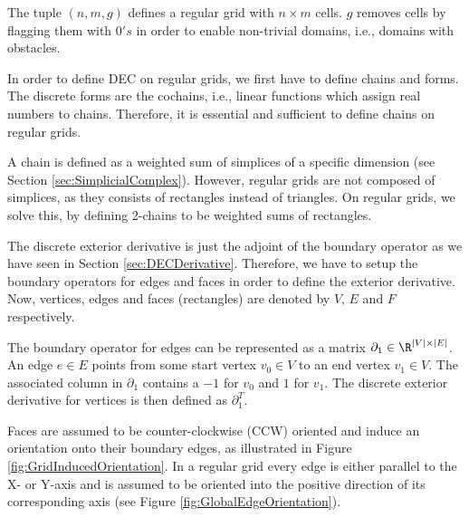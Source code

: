 The tuple $(n,m,g)$ defines a regular grid with $n \times m$ cells.
$g$ removes cells by flagging them with $0's$ in order to enable non-trivial domains, i.e., domains with obstacles.


In order to define DEC on regular grids, we first have to define chains and forms.
The discrete forms are the cochains, i.e., linear functions which assign real numbers to chains.
Therefore, it is essential and sufficient to define chains on regular grids.

A chain is defined as a weighted sum of simplices of a specific dimension (see Section \ref{sec:SimplicialComplex}).
However, regular grids are not composed of simplices, as they consists of rectangles instead of triangles.
On regular grids, we solve this, by defining 2-chains to be weighted sums of rectangles.


The discrete exterior derivative is just the adjoint of the boundary operator as we have seen in Section \ref{sec:DECDerivative}.
Therefore, we have to setup the boundary operators for edges and faces in order to define the exterior derivative.
Now, vertices, edges and faces (rectangles) are denoted by $V$, $E$ and $F$ respectively.

The boundary operator for edges can be represented as a matrix $\partial_1 \in \R^{|V|\times|E|}$.
An edge $e \in E$ points from some start vertex $v_0 \in V$ to an end vertex $v_1 \in V$.
The associated column in $\partial_1$ contains a $-1$ for $v_0$ and $1$ for $v_1$.
The discrete exterior derivative for vertices is then defined as $\partial_1^T$.

Faces are assumed to be counter-clockwise (CCW) oriented and induce an orientation onto their boundary edges, as illustrated in Figure \ref{fig:GridInducedOrientation}.
In a regular grid every edge is either parallel to the X- or Y-axis and is assumed to be oriented into the positive direction of its corresponding axis (see Figure \ref{fig:GlobalEdgeOrientation}).

\begin{figure}[h!]
	\begin{minipage}[b]{0.5 \linewidth}
		\centering
	\end{minipage}
	\begin{minipage}[b]{0.5 \linewidth}
		\centering
	\end{minipage}	
\caption[Induced and global orientation of primal edges.]{}
\end{figure}


